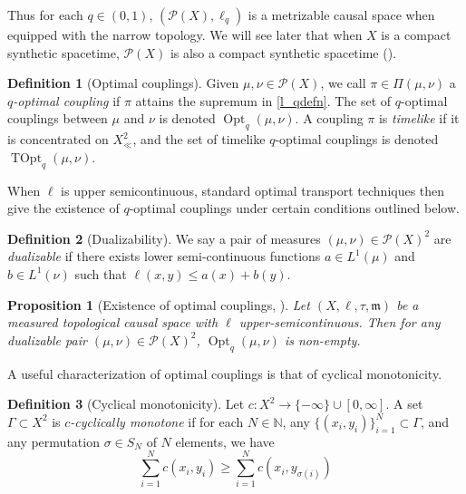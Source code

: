 \documentclass{article}
\newcommand{\N}{\mathbb{N}}
\newcommand{\m}{\mathfrak{m}}
\newcommand{\Pcal}{\mathcal{P}}
\DeclareMathOperator{\Opt}{Opt}
\DeclareMathOperator{\TOpt}{TOpt}
\newtheorem{prop}[theorem]{Proposition}
\theoremstyle{definition}
\newtheorem{defn}{Definition}[section]
\begin{document}
{ Thus for each $q\in (0,1)$, $(\Pcal(X), \ell_q)$ is a metrizable causal space when equipped with the narrow topology. We will see later that when $X$ is a compact synthetic spacetime, $\Pcal(X)$ is also a compact synthetic spacetime (). 
 
\begin{defn}[Optimal couplings] Given $\mu,\nu\in \Pcal(X)$, we call $\pi\in \Pi(\mu,\nu)$ a {\it $q$-optimal coupling} if $\pi$ attains the supremum in \eqref{l_qdefn}. The set of $q$-optimal couplings between $\mu$ and $\nu$ is denoted $\Opt_q(\mu, \nu)$. A coupling $\pi$ is {\it timelike} if it is concentrated on $X_\ll^2$, and the set of timelike $q$-optimal couplings is denoted $\TOpt_q(\mu,\nu)$. 
\end{defn}

When $\ell$ is upper semicontinuous, standard optimal transport techniques then give the existence of $q$-optimal couplings under certain conditions outlined below. 

\begin{defn}[Dualizability]
We say a pair of measures $(\mu, \nu)\in\Pcal(X)^2$ are {\it dualizable} if there exists lower semi-continuous functions $a\in L^1(\mu)$ and $b\in L^1(\nu)$ such that $\ell(x,y)\leq a(x)+b(y)$. 
\end{defn}

\begin{prop}[Existence of optimal couplings, ] Let $(X,\ell, \tau, \m)$ be a measured topological causal space with $\ell$ upper-semicontinuous. Then for any dualizable pair $(\mu,\nu)\in \Pcal(X)^2$, $\Opt_q(\mu, \nu)$ is non-empty. 
\end{prop}

A useful characterization of optimal couplings is that of cyclical monotonicity. 


\begin{defn}[Cyclical monotonicity] Let $c:X^2\to \{-\infty\}\cup [0,\infty]$. A set $\Gamma\subset X^2$ is {\it $c$-cyclically monotone} if for each $N\in \N$, any $\{(x_i,y_i)\}_{i=1}^N\subset \Gamma$, and any permutation $\sigma\in S_N$ of $N$ elements, we have 
\[\sum_{i=1}^Nc(x_i, y_i)\geq \sum_{i=1}^N c(x_i, y_{\sigma(i)})\]
\end{defn}

}
\end{document}
